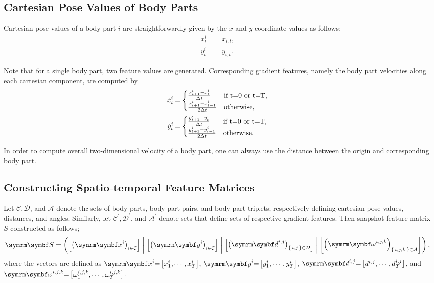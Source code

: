 \subsection{Cartesian Pose Values of Body Parts}
Cartesian pose values of a body part $i$ are straightforwardly given by the $x$ and $y$ coordinate values as follows:
\begin{equation}
	\begin{aligned}
		x^{i}_t & = x_{i,t}, \\
		y^{i}_t & = y_{i,t}.
	\end{aligned}
\end{equation}

Note that for a single body part, two feature values are generated.
Corresponding gradient features, namely the body part velocities along each cartesian component, are computed by
\begin{equation}
	\begin{aligned}
		\dot{x}^{i}_t & = \begin{cases} \frac{x^{i}_{t+1} - x^{i}_{t}}{\Delta t} & \textnormal{if } $t=0$ \textnormal{ or } $t=T$, \\ \frac{x^{i}_{t+1} - x^{i}_{t-1}}{2\Delta t} & \textnormal{otherwise}, \end{cases} \\
		\dot{y}^{i}_t & = \begin{cases} \frac{y^{i}_{t+1} - y^{i}_{t}}{\Delta t} & \textnormal{if } $t=0$ \textnormal{ or } $t=T$, \\ \frac{y^{i}_{t+1} - y^{i}_{t-1}}{2\Delta t} & \textnormal{otherwise}. \end{cases}
	\end{aligned}
\end{equation}

In order to compute overall two-dimensional velocity of a body part, one can always use the distance between the origin and corresponding body part.

\subsection{Constructing Spatio-temporal Feature Matrices}
Let $\mathcal{C}, \mathcal{D}$, and $\mathcal{A}$ denote the sets of body parts, body part pairs, and body part triplets; respectively defining cartesian pose values, distances, and angles.
Similarly, let $\mathcal{C}^{\prime}, \mathcal{D}^{\prime}$, and $\mathcal{A}^{\prime}$ denote sets that define sets of respective gradient features.
Then snapshot feature matrix $S$ constructed as follows;
\begin{equation}
	\V{S} = \rbr{\qmatrix{\rbr{\V{x}^i}_{i \in \mathcal{C}}} \concat \qmatrix{\rbr{\V{y}^i}_{i \in \mathcal{C}}} \concat \qmatrix{\rbr{\V{d}^{i,j}}_{\set{i,j} \in \mathcal{D}}} \concat \qmatrix{\rbr{\V{\omega}^{i,j,k}}_{\set{i,j,k} \in \mathcal{A}}}},
\end{equation}
where the vectors are defined as $\V{x}^{i}{=}\qmatrix{x^{i}_1, \cdots, x^{i}_T}$, $\V{y}^{i}{=}\qmatrix{y^{i}_1, \cdots, y^{i}_T}$,   $\V{d}^{i,j}{=}\qmatrix{d^{i,j}, \cdots, d^{i,j}_T}$, and $\V{\omega}^{i,j,k}{=}\qmatrix{\omega_1^{i,j,k}, \cdots, \omega^{i,j,k}_T}$.

